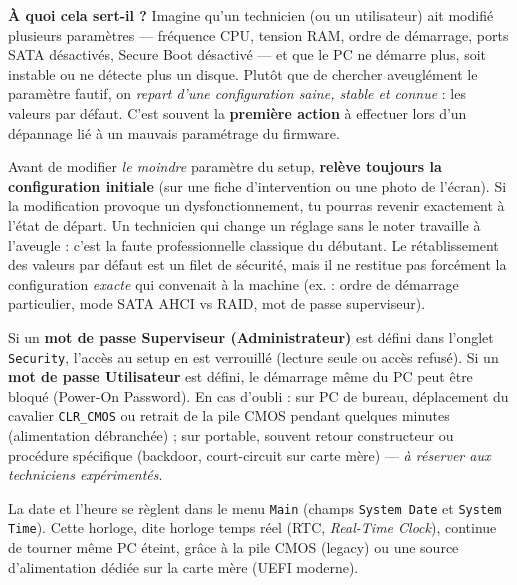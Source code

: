 \documentclass[11pt]{article}
\newcommand{\cle}[1]{{\popxbold\color{popdark}#1}}
\newcounter{popsec}
\newcounter{popsub}
\newcommand{\courssub}[1]{%
  \stepcounter{popsub}%
  \par\vspace{9pt}\noindent{\popxbold\fontsize{11.5}{13}\selectfont\color{popink}{\color{poporange}\thepopsec.\thepopsub}\hspace{6pt}#1}\par\nopagebreak\vspace{4pt}
}
\begin{document}
\textbf{À quoi cela sert-il ?} Imagine qu'un technicien (ou un utilisateur) ait modifié plusieurs paramètres — fréquence CPU, tension RAM, ordre de démarrage, ports SATA désactivés, Secure Boot désactivé — et que le PC ne démarre plus, soit instable ou ne détecte plus un disque. Plutôt que de chercher aveuglément le paramètre fautif, on \emph{repart d'une configuration saine, stable et connue} : les valeurs par défaut. C'est souvent la \textbf{première action} à effectuer lors d'un dépannage lié à un mauvais paramétrage du firmware.

\begin{attention}
Avant de modifier \emph{le moindre} paramètre du setup, \textbf{relève toujours la configuration initiale} (sur une fiche d'intervention ou une photo de l'écran). Si la modification provoque un dysfonctionnement, tu pourras revenir exactement à l'état de départ. Un technicien qui change un réglage sans le noter travaille à l'aveugle : c'est la faute professionnelle classique du débutant. Le rétablissement des valeurs par défaut est un filet de sécurité, mais il ne restitue pas forcément la configuration \emph{exacte} qui convenait à la machine (ex. : ordre de démarrage particulier, mode SATA AHCI vs RAID, mot de passe superviseur).
\end{attention}

\begin{attention}
Si un \textbf{mot de passe Superviseur (Administrateur)} est défini dans l'onglet \texttt{Security}, l'accès au setup en est verrouillé (lecture seule ou accès refusé). Si un \textbf{mot de passe Utilisateur} est défini, le démarrage même du PC peut être bloqué (Power-On Password). En cas d'oubli : sur PC de bureau, déplacement du cavalier \texttt{CLR\_CMOS} ou retrait de la pile CMOS pendant quelques minutes (alimentation débranchée) ; sur portable, souvent retour constructeur ou procédure spécifique (backdoor, court-circuit sur carte mère) — \emph{à réserver aux techniciens expérimentés}.
\end{attention}

\courssub{Définir la date et l'heure du système}

La date et l'heure se règlent dans le menu \texttt{Main} (champs \texttt{System Date} et \texttt{System Time}). Cette horloge, dite \cle{horloge temps réel} (RTC, \emph{Real-Time Clock}), continue de tourner même PC éteint, grâce à la pile CMOS (legacy) ou une source d'alimentation dédiée sur la carte mère (UEFI moderne).
\end{document}
